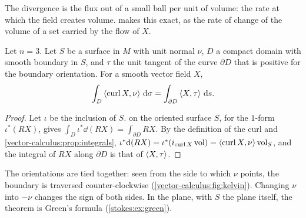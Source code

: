 \begin{notechapter}
The divergence is the flux out of a small ball per unit of volume: the
rate at which the field creates volume.  makes
this exact, as the rate of change of the volume of a set carried by
the flow of $X$.

\begin{theorem}\label{vector-calculus:thm:kelvin-stokes}
Let $n = 3$. Let $S$ be a surface in $M$ with unit normal $\nu$, $D$ a
compact domain with smooth boundary in $S$, and $\tau$ the unit tangent
of the curve $\partial D$ that is positive for the boundary
orientation. For a smooth vector field $X$,
\[
  \int_D\left\langle \operatorname{curl}X, \nu \right\rangle\,\mathrm{d}\sigma
  = \int_{\partial D}\left\langle X, \tau \right\rangle\,\mathrm{d} s .
\]
\end{theorem}

\begin{proof}
Let $\iota$ be the inclusion of $S$.  on the
oriented surface $S$, for the $1$-form $\iota^*(RX)$, gives
$\int_D\iota^*\dd(RX) = \int_{\partial D}RX$. By the definition of the
curl and \cref{vector-calculus:prop:integrals},
$\iota^*\mathrm{d}(RX) = \iota^*(i_{\operatorname{curl}X}\operatorname{vol})
= \left\langle \operatorname{curl}X, \nu \right\rangle\operatorname{vol}_S$, and the
integral of $RX$ along $\partial D$ is that of $\left\langle X, \tau \right\rangle$.
\end{proof}

The orientations are tied together: seen from the side to which $\nu$
points, the boundary is traversed counter-clockwise
(\cref{vector-calculus:fig:kelvin}). Changing $\nu$ into $-\nu$ changes
the sign of both sides. In the plane, with $S$ the plane itself, the
theorem is Green's formula (\cref{stokes:ex:green}).


\end{notechapter}
